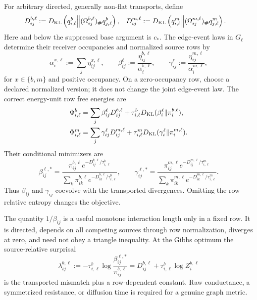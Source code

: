 For arbitrary directed, generally non-flat transports, define
\begin{align}
D_{ij}^{b,\ell}
&:=D_{\mathrm{KL}}\left(q_{i,\ell}^b\middle\Vert
(\Omega_{ij}^{b,\ell})_\#q_{j,\ell}^b\right),
&
D_{ij}^{m,\ell}
&:=D_{\mathrm{KL}}\left(q_{i,\ell}^m\middle\Vert
(\Omega_{ij}^{m,\ell})_\#q_{j,\ell}^m\right).
\label{eq:full-graph-transported-divergences}
\end{align}
Here and below the suppressed base argument is $c_*$. The edge-event laws in
$G_\ell$ determine their receiver occupancies and normalized source rows by
\begin{equation}
\alpha_i^{x,\ell}:=\sum_j\eta_{ij}^{x,\ell},
\qquad
\beta_{ij}^\ell:=\frac{\eta_{ij}^{b,\ell}}{\alpha_i^{b,\ell}},
\qquad
\gamma_{ij}^\ell:=\frac{\eta_{ij}^{m,\ell}}{\alpha_i^{m,\ell}},
\label{eq:full-graph-edge-event-disintegration}
\end{equation}
for $x\in\{b,m\}$ and positive occupancy. On a zero-occupancy row, choose a
declared normalized version; it does not change the joint edge-event law.
The correct energy-unit row free energies are
\begin{align}
\Phi_{i,\ell}^b
&=\sum_j\beta_{ij}^\ell D_{ij}^{b,\ell}
+\tau_{i,\ell}^bD_{\mathrm{KL}}(\beta_i^\ell\Vert\pi_i^{b,\ell}),
\nonumber\\
\Phi_{i,\ell}^m
&=\sum_j\gamma_{ij}^\ell D_{ij}^{m,\ell}
+\tau_{i,\ell}^mD_{\mathrm{KL}}(\gamma_i^\ell\Vert\pi_i^{m,\ell}).
\label{eq:full-graph-row-free-energies}
\end{align}
Their conditional minimizers are
\begin{equation}
\beta_{ij}^{\ell,*}
=\frac{\pi_{ij}^{b,\ell}e^{-D_{ij}^{b,\ell}/\tau_{i,\ell}^b}}
{\sum_k\pi_{ik}^{b,\ell}e^{-D_{ik}^{b,\ell}/\tau_{i,\ell}^b}},
\qquad
\gamma_{ij}^{\ell,*}
=\frac{\pi_{ij}^{m,\ell}e^{-D_{ij}^{m,\ell}/\tau_{i,\ell}^m}}
{\sum_k\pi_{ik}^{m,\ell}e^{-D_{ik}^{m,\ell}/\tau_{i,\ell}^m}}.
\label{eq:full-graph-gibbs-rows}
\end{equation}
Thus $\beta_{ij}$ and $\gamma_{ij}$ coevolve with the transported divergences.
Omitting the row relative entropy changes the objective. 

The quantity $1/\beta_{ij}$ is a useful monotone interaction length only in a
fixed row. It is directed, depends on all competing sources through row
normalization, diverges at zero, and need not obey a triangle inequality. At
the Gibbs optimum the source-relative surprisal
\begin{equation}
\lambda_{ij}^{b,\ell}:=-\tau_{i,\ell}^b
\log\frac{\beta_{ij}^{\ell,*}}{\pi_{ij}^{b,\ell}}
=D_{ij}^{b,\ell}+\tau_{i,\ell}^b\log Z_i^{b,\ell}
\label{eq:full-graph-attention-length}
\end{equation}
is the transported mismatch plus a row-dependent constant. Raw conductance,
a symmetrized resistance, or diffusion time is required for a genuine graph
metric. 

